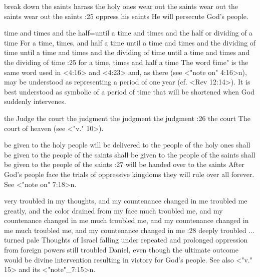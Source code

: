     {break down the saints} %
    {harass the holy ones} %
    {wear out the saints} %
    {wear out the saints} %
    {wear out the saints} %
:25 {oppress his saints} He will persecute God's people.

    {time and times and the half}={until a time and times and the half or dividing of a time} %
    {For a time, times, and half a time} %
    {until a time and times and the dividing of time} %
    {until a time and times and the dividing of time} %
    {until a time and times and the dividing of time} %
:25 {for a  time, times and half a time} The word \"time" is the same word
used in <4:16> and <4:23> and, as there (see <"note on" 4:16>n), may be understood as representing a period
of one year (cf. <Rev 12:14>). It is  
best understood as symbolic of a period of time that will be shortened when God suddenly
intervenes.

    {the Judge} %
    {the court} %
    {the judgment} %
    {the judgment} %
    {the judgment} %
:26 {the court} The court of heaven (see <"v." 10>).

    {be given to the holy people} %
    {will be delivered to the people of the holy ones} %
    {shall be given to the people of the saints} %
    {shall be given to the people of the saints} %
    {shall be given to the people of the saints} %
:27 {will be handed over to the saints} After God's people face 
the trials of oppressive kingdoms they will rule over all forever. See 
<"note on" 7:18>n. 

    {very troubled in my thoughts, and my countenance changed in me} %
    {troubled me greatly, and the color drained from my face} %
    {much troubled me, and my countenance changed in me} %
    {much troubled me, and my countenance changed in me} %
    {much troubled me, and my countenance changed in me} %
:28 {deeply troubled ... turned pale} Thoughts of Israel falling 
under repeated and prolonged oppression from foreign powers still 
troubled Daniel, even though the ultimate outcome would be divine intervention resulting in victory
for God's people. See also <"v." 15> and its <"note"_7:15>n.


